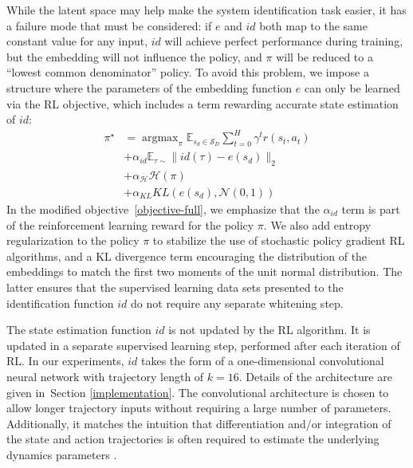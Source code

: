 \documentclass{article}
\newcommand{\E}{\mathbb{E}}
\newcommand{\TODO}[1]{}
\newcommand{\cH}{\mathcal{H}}
\newcommand{\cN}{\mathcal{N}}
\newcommand{\cS}{\mathcal{S}}
\DeclareMathOperator*{\argmax}{argmax}
\newcommand{\embedfn}{e}
\newcommand{\idfn}{id}
\newcommand{\secref}[1]{Section \ref{#1}}
\begin{document}
While the latent space may help make the system identification task easier,
it has a failure mode that must be considered:
if $\embedfn$ and $\idfn$ both map to the same constant value for any input,
$\idfn$ will achieve perfect performance during training,
but the embedding will not influence the policy, and $\pi$ will be reduced to a ``lowest common denominator'' policy.
To avoid this problem, we impose a structure where the parameters of the embedding function $e$
can only be learned via the RL objective, which includes a term rewarding accurate state estimation of $id$:
\begin{equation}\begin{split}
\pi^\star &= \argmax_\pi \E_{s_d \in \cS_D} \sum_{t = 0}^H \gamma^t r(s_t, a_t) \\
&+ \alpha_{id} \E_{\tau \sim \text{\TODO{complicated}}} \| id(\tau) - e(s_d) \|_2 \\
&+ \alpha_{\cH}\cH(\pi) \\
&+ \alpha_{KL} KL(e(s_d), \cN(0,1))
\label{objective-full}
\end{split}\end{equation}
In the modified objective~\eqref{objective-full},
we emphasize that the $\alpha_{id}$ term is part of the reinforcement learning reward
for the policy $\pi$.
We also add entropy regularization to the policy $\pi$ to stabilize the use of stochastic policy gradient RL algorithms,
and a KL divergence term encouraging the distribution of the embeddings
to match the first two moments of the unit normal distribution.
The latter ensures that the supervised learning data sets presented to the identification function $id$ do not require any separate whitening step.
\TODO{better motivation? It also helps avoid the collapse to a constant function,
but technically we already ``solve'' that by adding the estimation loss to the RL objective...}

The state estimation function $id$ is not updated by the RL algorithm.
It is updated in a separate supervised learning step, performed after each iteration of RL.
In our experiments, $id$ takes the form of a one-dimensional convolutional neural network
with trajectory length of $k = 16$.
Details of the architecture are given in~\secref{implementation}.
The convolutional architecture is chosen to allow longer trajectory inputs
without requiring a large number of parameters.
Additionally, it matches the intuition that differentiation and/or integration of the state and action trajectories
is often required to estimate the underlying dynamics parameters \TODO{cite?}.
\end{document}
